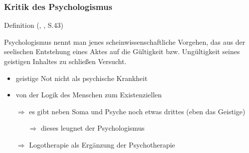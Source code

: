 \documentclass{beamer}
\begin{document}
\begin{frame}
\frametitle{Kritik des Psychologismus}

  \begin{block}{Definition (\citeauthor{Frankl2015}, \citeyear{Frankl2015}, S.43)}
    
    \begin{small}
    {Psychologismus nennt man \glqq{}jenes scheinwissenschaftliche Vorgehen, das aus der seelischen Entstehung eines Aktes auf die Gültigkeit bzw. Ungültigkeit seines geistigen Inhaltes zu schließen Versucht\grqq{}.}    
    \end{small}
    
  \end{block}

  \begin{itemize}
  \setlength{\itemsep}{6pt}
  
  
    \pause
    
    \item geistige Not nicht als psychische Krankheit
    
    \item von der Logik des Menschen zum Existenziellen
    
    \pause
    
    \item[$\Rightarrow$] es gibt neben Soma und Psyche noch etwas drittes (eben das Geistige)
    \begin{itemize}
      \item[$\Rightarrow$] dieses leugnet der Psychologismus
    \end{itemize}
    
    \pause
    
    \item[$\Rightarrow$] Logotherapie als Ergänzung der Psychotherapie
  \end{itemize}

\end{frame}
\end{document}
